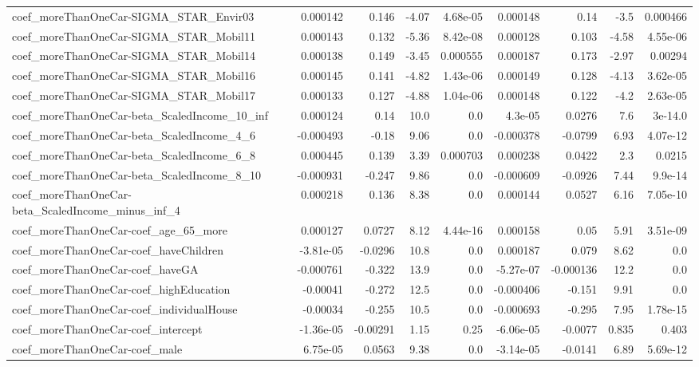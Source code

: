 \begin{tabular}{lrrrrrrrr}
coef_moreThanOneCar-SIGMA_STAR_Envir03 & 0.000142 & 0.146 & -4.07 & 4.68e-05 & 0.000148 & 0.14 & -3.5 & 0.000466 \\
coef_moreThanOneCar-SIGMA_STAR_Mobil11 & 0.000143 & 0.132 & -5.36 & 8.42e-08 & 0.000128 & 0.103 & -4.58 & 4.55e-06 \\
coef_moreThanOneCar-SIGMA_STAR_Mobil14 & 0.000138 & 0.149 & -3.45 & 0.000555 & 0.000187 & 0.173 & -2.97 & 0.00294 \\
coef_moreThanOneCar-SIGMA_STAR_Mobil16 & 0.000145 & 0.141 & -4.82 & 1.43e-06 & 0.000149 & 0.128 & -4.13 & 3.62e-05 \\
coef_moreThanOneCar-SIGMA_STAR_Mobil17 & 0.000133 & 0.127 & -4.88 & 1.04e-06 & 0.000148 & 0.122 & -4.2 & 2.63e-05 \\
coef_moreThanOneCar-beta_ScaledIncome_10_inf & 0.000124 & 0.14 & 10.0 & 0.0 & 4.3e-05 & 0.0276 & 7.6 & 3e-14.0 \\
coef_moreThanOneCar-beta_ScaledIncome_4_6 & -0.000493 & -0.18 & 9.06 & 0.0 & -0.000378 & -0.0799 & 6.93 & 4.07e-12 \\
coef_moreThanOneCar-beta_ScaledIncome_6_8 & 0.000445 & 0.139 & 3.39 & 0.000703 & 0.000238 & 0.0422 & 2.3 & 0.0215 \\
coef_moreThanOneCar-beta_ScaledIncome_8_10 & -0.000931 & -0.247 & 9.86 & 0.0 & -0.000609 & -0.0926 & 7.44 & 9.9e-14 \\
coef_moreThanOneCar-beta_ScaledIncome_minus_inf_4 & 0.000218 & 0.136 & 8.38 & 0.0 & 0.000144 & 0.0527 & 6.16 & 7.05e-10 \\
coef_moreThanOneCar-coef_age_65_more & 0.000127 & 0.0727 & 8.12 & 4.44e-16 & 0.000158 & 0.05 & 5.91 & 3.51e-09 \\
coef_moreThanOneCar-coef_haveChildren & -3.81e-05 & -0.0296 & 10.8 & 0.0 & 0.000187 & 0.079 & 8.62 & 0.0 \\
coef_moreThanOneCar-coef_haveGA & -0.000761 & -0.322 & 13.9 & 0.0 & -5.27e-07 & -0.000136 & 12.2 & 0.0 \\
coef_moreThanOneCar-coef_highEducation & -0.00041 & -0.272 & 12.5 & 0.0 & -0.000406 & -0.151 & 9.91 & 0.0 \\
coef_moreThanOneCar-coef_individualHouse & -0.00034 & -0.255 & 10.5 & 0.0 & -0.000693 & -0.295 & 7.95 & 1.78e-15 \\
coef_moreThanOneCar-coef_intercept & -1.36e-05 & -0.00291 & 1.15 & 0.25 & -6.06e-05 & -0.0077 & 0.835 & 0.403 \\
coef_moreThanOneCar-coef_male & 6.75e-05 & 0.0563 & 9.38 & 0.0 & -3.14e-05 & -0.0141 & 6.89 & 5.69e-12 \\

\end{tabular}
